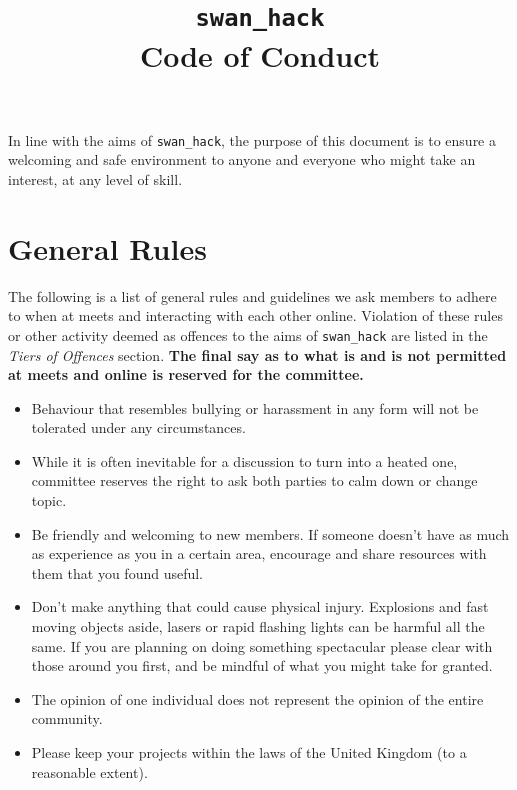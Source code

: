 \documentclass[12pt]{extarticle}
\title{\vspace{-2cm}\texttt{swan\_hack} \\ {Code of Conduct}\vspace{-1cm}}
\date{}
\begin{document}
	\maketitle
	In line with the aims of \texttt{swan\_hack}, the purpose of this document is to ensure a welcoming and safe environment to anyone and everyone who might take an interest, at any level of skill. 
	
	\section{General Rules}
	The following is a list of general rules and guidelines we ask members to adhere to when at meets and interacting with each other online. Violation of these rules or other activity deemed as offences to the aims of \texttt{swan\_hack} are listed in the \emph{Tiers of Offences} section.
    \textbf{The final say as to what is and is not permitted at meets and online is reserved for the committee.}
    
	\begin{itemize}
		\item Behaviour that resembles bullying or harassment in any form will not be tolerated under any circumstances. 
		\item While it is often inevitable for a discussion to turn into a heated one, committee reserves the right to ask both parties to calm down or change topic.
		\item Be friendly and welcoming to new members. If someone doesn't have as much as experience as you in a certain area, encourage and share resources with them that you found useful.
		\item Don't make anything that could cause physical injury. Explosions and fast moving objects aside, lasers or rapid flashing lights can be harmful all the same. If you are planning on doing something spectacular please clear with those around you first, and be mindful of what you might take for granted.
		\item The opinion of one individual does not represent the opinion of the entire community.
		\item Please keep your projects within the laws of the United Kingdom (to a reasonable extent).
	\end{itemize}   
	
\end{document}
